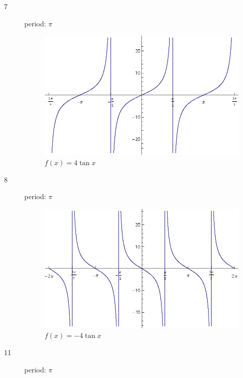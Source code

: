 \documentclass{exam}
\begin{document}
    \begin{description}

      \item[7]
        period: $\pi$

        \begin{figure}[H]
          \centering
          \includegraphics[scale=0.8]{exercise07.eps}
          \caption{$f(x) = 4 \tan x$}
        \end{figure}

      \item[8]
        period: $\pi$

        \begin{figure}[H]
          \centering
          \includegraphics[scale=0.8]{exercise08.eps}
          \caption{$f(x) = -4 \tan x$}
        \end{figure}

      \item[11]
        period: $\pi$


\end{description}
\end{document}
